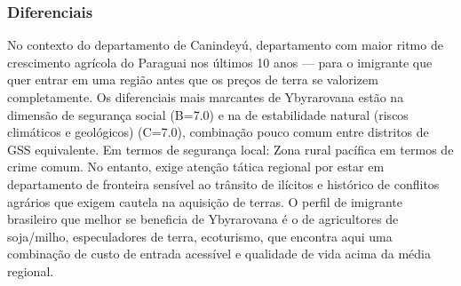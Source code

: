 \subsubsection*{Diferenciais}\label{dif-ybyrarovana-1412}
No contexto do departamento de Canindeyú, departamento com maior ritmo de crescimento agrícola do Paraguai nos últimos 10 anos — para o imigrante que quer entrar em uma região antes que os preços de terra se valorizem completamente. Os diferenciais mais marcantes de Ybyrarovana estão na dimensão de segurança social (B=7.0) e na de estabilidade natural (riscos climáticos e geológicos) (C=7.0), combinação pouco comum entre distritos de GSS equivalente. Em termos de segurança local: Zona rural pacífica em termos de crime comum. No entanto, exige atenção tática regional por estar em departamento de fronteira sensível ao trânsito de ilícitos e histórico de conflitos agrários que exigem cautela na aquisição de terras. O perfil de imigrante brasileiro que melhor se beneficia de Ybyrarovana é o de agricultores de soja/milho, especuladores de terra, ecoturismo, que encontra aqui uma combinação de custo de entrada acessível e qualidade de vida acima da média regional.
